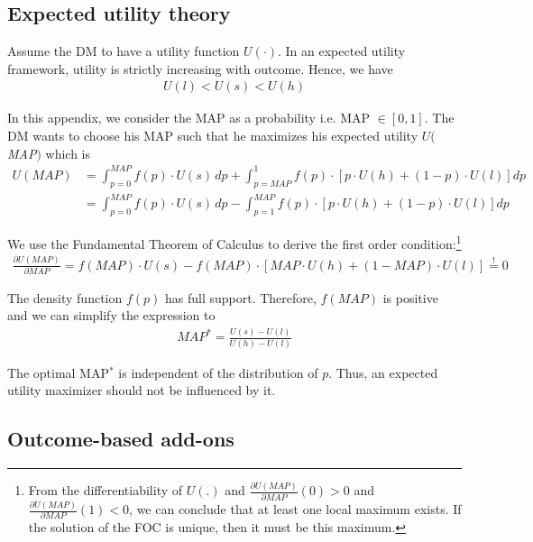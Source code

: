 \documentclass[pdftex,12pt, a4paper]{article}
\begin{document}
\subsection{Expected utility theory}
\label{subsec:EUT}

Assume the DM to have a utility function $U(\cdot)$. 
In an expected utility framework, utility is strictly increasing with outcome.
Hence, we have 
\begin{align}
	U(l) < U(s) < U(h)
\end{align}

In this appendix, we consider the MAP as a probability i.e. MAP $\in [0,1]$. The DM wants to choose his MAP such that he maximizes his expected utility $U($\textit{MAP}$)$ which is
\begin{align}
	U(\textit{MAP}) &= \int_{p=0}^{\textit{MAP}} f(p) \cdot U(s) \, dp %
	+ \int_{p=\textit{MAP}}^1 f(p) \cdot \left[p \cdot U(h) + (1-p) \cdot U(l) \right] dp \\
	     &= \int_{p=0}^{\textit{MAP}} f(p) \cdot U(s) \, dp %
	     - \int_{p=1}^{\textit{MAP}} f(p) \cdot \left[p \cdot U(h) + (1-p) \cdot U(l) \right] dp 
\end{align}

We use the Fundamental Theorem of Calculus to derive the first order condition:\footnote{
From the differentiability of $U(.)$ and $\frac{\partial U(\textit{MAP})}{\partial \textit{MAP}} (0) > 0 $ and $\frac{\partial U(\textit{MAP})}{\partial \textit{MAP}} (1) < 0$, we can conclude that at least one local maximum exists.
If the solution of the FOC is unique, then it must be this maximum.
}
\begin{align}
	\frac{\partial U(\textit{MAP})}{\partial\textit{MAP}} %
	= f(\textit{MAP}) \cdot U(s) - f(\textit{MAP}) \cdot \left[\textit{MAP} \cdot U(h) + (1-\textit{MAP}) \cdot U(l) \right] \stackrel{!}{=} 0
\end{align}

The density function $f(p)$ has full support.
Therefore, $f(\textit{MAP})$ is positive and we can simplify the expression to 
\begin{align}
	\textit{MAP}^* = \frac{U(s)-U(l)}{U(h)-U(l)}
\end{align}

The optimal MAP$^*$ is independent of the distribution of $p$.
Thus, an expected utility maximizer should not be influenced by it. 


\subsection{Outcome-based add-ons}
\end{document}
